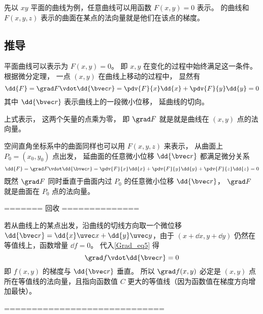 
\begin{issues}
\issueDraft
\end{issues}


先以 $xy$ 平面的曲线为例，任意曲线可以用函数 $F(x, y) = 0$ 表示。 的曲线和 $F(x, y, z)$ 表示的曲面在某点的法向量就是他们在该点的梯度。

\subsection{推导}

平面曲线可以表示为 $F(x, y) = 0$。 即 $x, y$ 在变化的过程中始终满足这一条件。 根据微分定理， 一点 $(x, y)$ 在曲线上移动的过程中， 显然有
\begin{equation}
\dd{F} = \grad F \vdot \dd{\bvec r} = \pdv{F}{x} \dd{x} + \pdv{F}{y} \dd{y} = 0
\end{equation}
其中 $\dd{\bvec r}$ 表示曲线上的一段微小位移， 延曲线的切向。

上式表示， 这两个矢量的点乘为零， 即 $\grad F$ 就是就是曲线在 $(x,y)$ 点的法向量。

空间直角坐标系中的曲面同样也可以用 $F(x, y, z)$ 来表示， 从曲面上 $P_0 = (x_0, y_0)$ 点出发， 延曲面的任意微小位移 $\dd{\bvec r}$ 都满足微分关系
\begin{equation}
\dd{F} = \grad F \vdot \dd{\bvec r} = \pdv{F}{x} \dd{x} + \pdv{F}{y} \dd{y} + \pdv{F}{z} \dd{z} = 0
\end{equation}
既然 $\grad F$ 同时垂直于曲面内过 $P_0$ 的任意微小位移 $\dd{\bvec r}$， $\grad F$ 就是曲面在 $P_0$ 点的法向量。

======= 回收 ==============

若从曲线上的某点出发，沿曲线的切线方向取一个微位移 $\dd{\bvec r} = \dd{x}\uvec x + \dd{y} \uvec y$，由于 $(x+\dd{x}, y+\dd{y})$ 仍然在等值线上，函数增量 $\dd{f} = 0$。 代入\autoref{Grad_eq5} 得
\begin{equation}
\grad f \vdot \dd{\bvec r} = 0
\end{equation}
即 $f(x,y)$ 的梯度与 $\dd{\bvec r}$ 垂直。 所以 $\grad f(x,y)$ 必定是 $(x,y)$ 点所在等值线的法向量，且指向函数值 $C$ 更大的等值线（因为函数值在梯度方向增加最快）。

=============================

